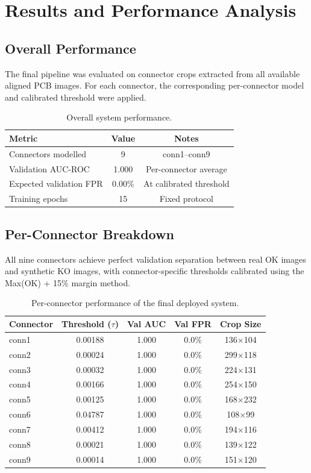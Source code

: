\documentclass[11pt,a4paper]{article}
\begin{document}
\section{Results and Performance Analysis}

\subsection{Overall Performance}

The final pipeline was evaluated on connector crops extracted from all available aligned PCB images. For each connector, the corresponding per-connector model and calibrated threshold were applied.

\begin{table}[H]
\centering
\begin{tabular}{lcc}
\toprule
Metric & Value & Notes \\
\midrule
Connectors modelled & 9 & conn1--conn9 \\
Validation AUC-ROC & 1.000 & Per-connector average \\
Expected validation FPR & 0.00\% & At calibrated threshold \\
Training epochs & 15 & Fixed protocol \\
\bottomrule
\end{tabular}
\caption{Overall system performance.}
\label{tab:overall}
\end{table}

\subsection{Per-Connector Breakdown}

All nine connectors achieve perfect validation separation between real OK images and synthetic KO images, with connector-specific thresholds calibrated using the Max(OK) + 15\% margin method.

\begin{table}[H]
\centering
\small
\begin{tabular}{lcccc}
\toprule
Connector & Threshold ($\tau$) & Val AUC & Val FPR & Crop Size \\
\midrule
conn1 & 0.00188 & 1.000 & 0.0\% & 136$\times$104 \\
conn2 & 0.00024 & 1.000 & 0.0\% & 299$\times$118 \\
conn3 & 0.00032 & 1.000 & 0.0\% & 224$\times$131 \\
conn4 & 0.00166 & 1.000 & 0.0\% & 254$\times$150 \\
conn5 & 0.00125 & 1.000 & 0.0\% & 168$\times$232 \\
conn6 & 0.04787 & 1.000 & 0.0\% & 108$\times$99 \\
conn7 & 0.00412 & 1.000 & 0.0\% & 194$\times$116 \\
conn8 & 0.00021 & 1.000 & 0.0\% & 139$\times$122 \\
conn9 & 0.00014 & 1.000 & 0.0\% & 151$\times$120 \\
\bottomrule
\end{tabular}
\caption{Per-connector performance of the final deployed system.}
\label{tab:per_connector}
\end{table}
\end{document}
